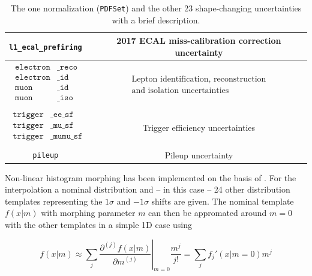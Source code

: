 \begin{table}[h!]
\begin{tabular}{cc}
		\hline
		\texttt{l1\_ecal\_prefiring  } & 2017 ECAL miss-calibration correction uncertainty \\
		
		\hline		
		$\begin{aligned}
			\texttt{electron}&\texttt{\_reco } \\
			\texttt{electron}&\texttt{\_id   } \\
			\texttt{muon}&\texttt{\_id       } \\
			\texttt{muon}&\texttt{\_iso      } \\
		\end{aligned}$         & $\begin{array}{c}
			\text{Lepton identification, reconstruction} \\
			\text{and isolation uncertainties}
		\end{array}$\\
		
		\hline
		$\begin{aligned}
			\texttt{trigger}&\texttt{\_ee\_sf  } \\
			\texttt{trigger}&\texttt{\_mu\_sf  } \\
			\texttt{trigger}&\texttt{\_mumu\_sf} \\
		\end{aligned}$ & Trigger efficiency uncertainties \\
		\hline
		\texttt{pileup               } & Pileup uncertainty \\
	\end{tabular}
	\caption{The one normalization (\texttt{PDFSet}) and the other 23 shape-changing uncertainties with a brief description.}
	\label{tab:s_sys_table}
\end{table}


Non-linear histogram morphing has been implemented on the basis of \cite{Baak_2015}. For the interpolation a nominal distribution and -- in this case -- 24 other distribution templates representing the $1\sigma$ and $-1\sigma$ shifts are given. The nominal template $f(x|m)$ with morphing parameter $m$ can then be appromated around $m=0$ with the other templates in a simple 1D case using

\begin{equation*}
	f(x|m) \approx \sum_j \left.\frac{\partial^{(j)} f(x|m)}{\partial m^{(j)}}\right|_{m=0}\frac{m^j}{j!} = \sum_j f_j'(x|m=0) m^j
\end{equation*}



